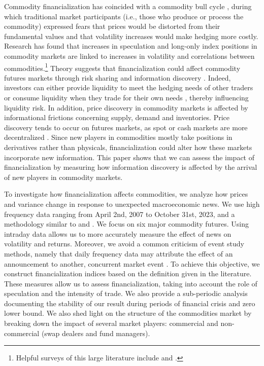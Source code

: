 Commodity financialization has coincided with a commodity bull cycle \citep*{humphreys2010great}, during which traditional market participants (i.e., those who produce or process the commodity) expressed fears that prices would be distorted from their fundamental values and that volatility increases would make hedging more costly. 
Research has found that increases in speculation and long-only index positions in commodity markets are linked to increases in volatility and correlations between commodities.\footnote{Helpful surveys of this large literature include \citet{boyd2018update} and \citet{cheng2014financialization}.}
 Theory suggests that financialization could affect commodity futures markets through risk sharing and information discovery \citep*{cheng2014financialization}. Indeed, investors can either provide liquidity to meet the hedging needs of other traders or consume liquidity when they trade for their own needs \citep*{kang2020tale}, thereby influencing liquidity risk. In addition, price discovery in commodity markets is affected by informational frictions concerning supply, demand and inventories. Price discovery tends to occur on futures markets, as spot or cash markets are more decentralized \citep*{garbade1983price}. Since new players in commodities mostly take positions in derivatives rather than physicals, financialization could alter how these markets incorporate new information.   This paper shows that we can assess the impact of financialization by measuring how information discovery is affected by the arrival of new players in commodity markets. 


To investigate how financialization affects commodities, we analyze how prices and variance change in response to unexpected macroeconomic news. We use high frequency data ranging from April 2nd, 2007 to October 31st, 2023, and a methodology similar to \citet*{andersen2007real} and \citet*{kurov2019price}. We focus on six major commodity futures. Using intraday data allows us to more accurately measure the effect of news on volatility and returns. Moreover, we avoid a common criticism of event study methods, namely that daily frequency data may attribute the effect of an announcement to another, concurrent market event \citep*[see e.g., ][]{kothari2007econometrics}. To achieve this objective, we construct financialization indices based on the definition given in the literature. These measures allow us to assess financialization, taking into account the role of speculation and the intensity of trade. We also provide a sub-periodic analysis documenting the stability of our result during periods of financial crisis and zero lower bound. We also shed light on the structure of the commodities market by breaking down the impact of several market players: commercial and non-commercial (swap dealers and fund managers).

